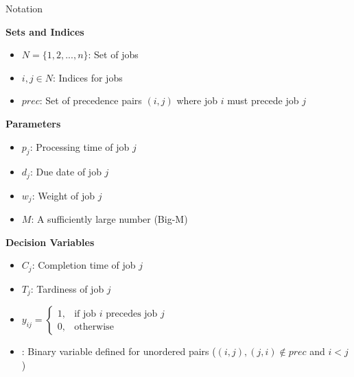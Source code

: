 \documentclass[10pt]{article}
\begin{document}
\begin{stabilitybox}{Notation}
  \begin{minipage}[t]{0.49\linewidth}
      \textbf{Sets and Indices}
      \begin{itemize}
          \item $N = \{1, 2, ..., n\}$: Set of jobs
          \item $i, j \in N$: Indices for jobs
          \item $prec$: Set of precedence pairs $(i, j)$ where job $i$ must precede job $j$
      \end{itemize}
      \textbf{Parameters}
      \begin{itemize}
          \item $p_j$: Processing time of job $j$
          \item $d_j$: Due date of job $j$
          \item $w_j$: Weight of job $j$
          \item $M$: A sufficiently large number (Big-M)
      \end{itemize}
  \end{minipage}
  \hfill
  \begin{minipage}[t]{0.49\linewidth}
      \textbf{Decision Variables}
      \begin{itemize}
          \item $C_j$: Completion time of job $j$ 
          \item $T_j$: Tardiness of job $j$
          \item $ y_{ij} = \begin{cases} 1, & \text{if job } i \text{ precedes job } j \\ 0, & \text{otherwise} \end{cases} $
          \item[]: Binary variable defined for unordered pairs ($(i,j), (j,i) \notin prec$ and $i<j$)
      \end{itemize}
  \end{minipage}
\end{stabilitybox}

\vspace{1em}
\end{document}
